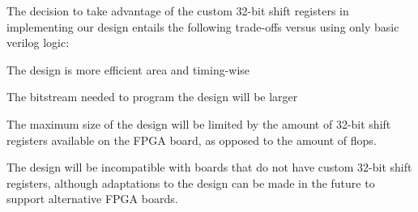 The decision to take advantage of the custom 32-bit shift registers in implementing our design entails the following trade-offs versus using only basic verilog logic:
\begin{itemlist}
	\item The design is more efficient area and timing-wise
	\item The bitstream needed to program the design will be larger
	\item The maximum size of the design will be limited by the amount of 32-bit shift registers available on the FPGA board, as opposed to the amount of flops.
	\item The design will be incompatible with boards that do not have custom 32-bit shift registers, although adaptations to the design can be made in the future to support alternative FPGA boards.
\end{itemlist}







